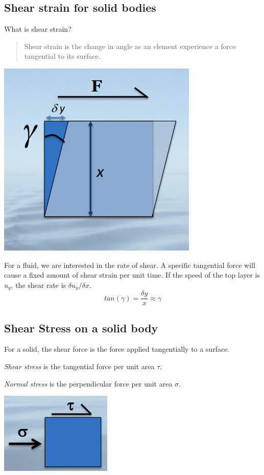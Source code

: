 \documentclass[class=report, crop=false, 12pt,a4paper]{standalone}
\begin{document}
\subsection{Shear strain for solid bodies}
What is shear strain?
\begin{quote}
  \begin{center}
    Shear strain is the change in angle as an element experience a force tangential to its surface.
  \end{center}
\end{quote}
\begin{center}
  \includegraphics[width = 0.4 \textwidth]{../img/ShearStrainDiagram}
\end{center}
For a fluid, we are interested in the rate of shear. A specific tangential force will cause a fixed amount of shear strain per unit time. If the speed of the top layer is \( u_y\), the shear rate is \(\delta u_y / \delta x\).
\begin{equation}
  tan(\gamma) = \frac{\delta y}{x} \approx \gamma
\end{equation}

\subsection{Shear Stress on a solid body}
For a solid, the shear force is the force applied tangentially to a surface.

\emph{Shear stress} is the tangential force per unit area \( \tau\).

\emph{Normal stress} is the perpendicular force per unit area \( \sigma \).

\begin{center}
  \includegraphics[width = 0.4 \textwidth]{../img/ShearForceDiagram}
\end{center}
\end{document}

